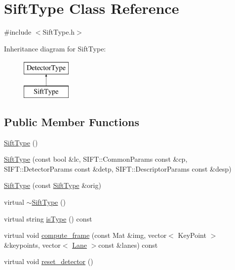 \hypertarget{class_sift_type}{
\section{\-Sift\-Type \-Class \-Reference}
\label{class_sift_type}
}


{\ttfamily \#include $<$\-Sift\-Type.\-h$>$}

\-Inheritance diagram for \-Sift\-Type\-:\begin{figure}[H]
\begin{center}
\leavevmode
\includegraphics[height=2.000000cm]{class_sift_type}
\end{center}
\end{figure}
\subsection*{\-Public \-Member \-Functions}
\begin{DoxyCompactItemize}
\item 
\hyperlink{class_sift_type_a8b39ad71da09d08c722e328f3c106a49}{\-Sift\-Type} ()
\item 
\hyperlink{class_sift_type_a9743d0d22ab134c2b8e677b1c7d7faf1}{\-Sift\-Type} (const bool \&lc, \-S\-I\-F\-T\-::\-Common\-Params const \&cp, \-S\-I\-F\-T\-::\-Detector\-Params const \&detp, \-S\-I\-F\-T\-::\-Descriptor\-Params const \&desp)
\item 
\hyperlink{class_sift_type_a628125d62cb5b2b3d90abe4218eefcbe}{\-Sift\-Type} (const \hyperlink{class_sift_type}{\-Sift\-Type} \&orig)
\item 
virtual \hyperlink{class_sift_type_a27bd3cb125c6042e0c78563388de784f}{$\sim$\-Sift\-Type} ()
\item 
virtual string \hyperlink{class_sift_type_a792597ebf8e051e9fe9581bd95aff535}{is\-Type} () const 
\item 
virtual void \hyperlink{class_sift_type_a642677043736bdfae4f8712235c427c8}{compute\-\_\-frame} (const \-Mat \&img, vector$<$ \-Key\-Point $>$ \&keypoints, vector$<$ \hyperlink{class_lane}{\-Lane} $>$const \&lanes) const 
\item 
virtual void \hyperlink{class_sift_type_a5a114bb493bb7fd4d2ed7cfd8201a59c}{reset\-\_\-detector} ()
\end{DoxyCompactItemize}
